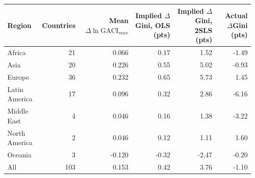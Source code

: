 \begin{tabular}{lrrrrr}
\toprule
Region & Countries & Mean $\Delta\ln\mathrm{GACI}_{max}$ & Implied $\Delta$Gini, OLS (pts) & Implied $\Delta$Gini, 2SLS (pts) & Actual $\Delta$Gini (pts) \\
\midrule
Africa & 21 & 0.066 & 0.17 & 1.52 & -1.49 \\
Asia & 20 & 0.226 & 0.55 & 5.02 & -0.93 \\
Europe & 36 & 0.232 & 0.65 & 5.73 & 1.45 \\
Latin America & 17 & 0.096 & 0.32 & 2.86 & -6.16 \\
Middle East & 4 & 0.046 & 0.16 & 1.38 & -3.22 \\
North America & 2 & 0.046 & 0.12 & 1.11 & 1.60 \\
Oceania & 3 & -0.120 & -0.32 & -2.47 & -0.20 \\
\midrule All & 103 & 0.153 & 0.42 & 3.76 & -1.10 \\
\bottomrule
\end{tabular}